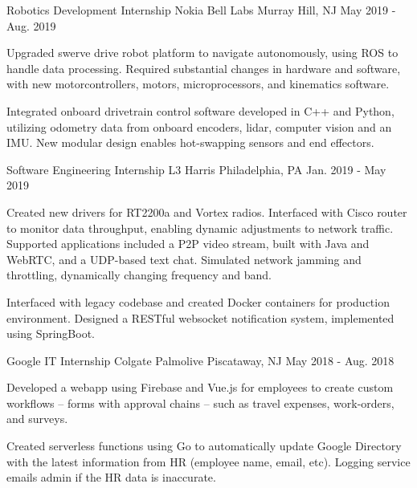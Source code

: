\begin{cventries}
  \cventry
  {Robotics Development Internship} %
  {Nokia Bell Labs} %
  {Murray Hill, NJ} %
  {May 2019 - Aug. 2019} %
  {
    \begin{cvitems} %
      \item {Upgraded swerve drive robot platform to navigate autonomously, using ROS to handle data processing. Required substantial changes in hardware and software, with new motorcontrollers, motors, microprocessors, and kinematics software.}
      \item {Integrated onboard drivetrain control software developed in C++ and Python, utilizing odometry data from onboard encoders, lidar, computer vision and an IMU. New modular design enables hot-swapping sensors and end effectors.}
    \end{cvitems}
  }

  \cventry
  {Software Engineering Internship} %
  {L3 Harris} %
  {Philadelphia, PA} %
  {Jan. 2019 - May 2019} %
  {
    \begin{cvitems} %
      \item {Created new drivers for RT2200a and Vortex radios. Interfaced  with Cisco router to monitor data throughput, enabling dynamic adjustments to network traffic. Supported applications included a P2P video stream, built with Java and WebRTC, and a UDP-based text chat. Simulated network jamming and throttling, dynamically changing frequency and band.}
      \item {Interfaced with legacy codebase and created Docker containers for production environment. Designed a RESTful websocket notification system, implemented using SpringBoot.}
    \end{cvitems}
  }

  \cventry
  {Google IT Internship} %
  {Colgate Palmolive} %
  {Piscataway, NJ} %
  {May 2018 - Aug. 2018} %
  {
    \begin{cvitems} %
      \item {Developed a webapp using Firebase and Vue.js for employees to create custom workflows -- forms with approval chains -- such as travel expenses, work-orders, and surveys.}
      \item {Created serverless functions using Go to automatically update Google Directory with the latest information from HR (employee name, email, etc). Logging service emails admin if the HR data is inaccurate.}
    \end{cvitems}
  }

\end{cventries}
